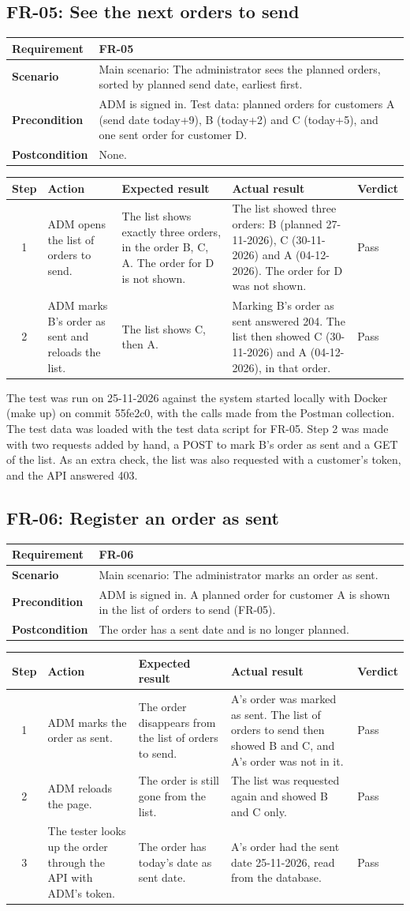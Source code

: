 \documentclass[a4paper,11pt]{article}
\newcommand{\scenarioinfo}[4]{%
  \noindent\begin{tabular}{|p{3cm}|p{12cm}|}
  \hline
  \textbf{Requirement} & \textbf{#1} \\
  \hline
  \textbf{Scenario} & #2 \\
  \hline
  \textbf{Precondition} & #3 \\
  \hline
  \textbf{Postcondition} & #4 \\
  \hline
  \end{tabular}\par\medskip}
\newenvironment{steps}{%
  \noindent\footnotesize
  \begin{tabular}{|c|p{3.6cm}|p{4.6cm}|p{3.2cm}|p{1.5cm}|}
  \hline
  \textbf{Step} & \textbf{Action} & \textbf{Expected result} & \textbf{Actual result} & \textbf{Verdict} \\
  \hline
}{%
  \end{tabular}\par\bigskip
}
\begin{document}
\subsection{FR-05: See the next orders to send}
\scenarioinfo{FR-05}
  {Main scenario: The administrator sees the planned orders, sorted by planned send date, earliest first.}
  {ADM is signed in. Test data: planned orders for customers A (send date today+9), B (today+2) and C (today+5), and one sent order for customer D.}
  {None.}
\begin{steps}
1 & ADM opens the list of orders to send. & The list shows exactly three orders, in the order B, C, A. The order for D is not shown. & The list showed three orders: B (planned 27-11-2026), C (30-11-2026) and A (04-12-2026). The order for D was not shown. & Pass \\
\hline
2 & ADM marks B's order as sent and reloads the list. & The list shows C, then A. & Marking B's order as sent answered 204. The list then showed C (30-11-2026) and A (04-12-2026), in that order. & Pass \\
\hline
\end{steps}

The test was run on 25-11-2026 against the system started locally with Docker (make up) on commit 55fe2c0, with the calls made from the Postman collection. The test data was loaded with the test data script for FR-05. Step 2 was made with two requests added by hand, a POST to mark B's order as sent and a GET of the list. As an extra check, the list was also requested with a customer's token, and the API answered 403.

\subsection{FR-06: Register an order as sent}
\scenarioinfo{FR-06}
  {Main scenario: The administrator marks an order as sent.}
  {ADM is signed in. A planned order for customer A is shown in the list of orders to send (FR-05).}
  {The order has a sent date and is no longer planned.}
\begin{steps}
1 & ADM marks the order as sent. & The order disappears from the list of orders to send. & A's order was marked as sent. The list of orders to send then showed B and C, and A's order was not in it. & Pass \\
\hline
2 & ADM reloads the page. & The order is still gone from the list. & The list was requested again and showed B and C only. & Pass \\
\hline
3 & The tester looks up the order through the API with ADM's token. & The order has today's date as sent date. & A's order had the sent date 25-11-2026, read from the database. & Pass \\
\hline
\end{steps}
\end{document}

